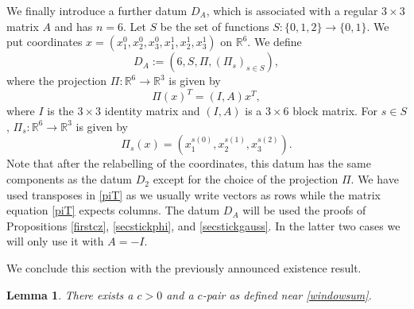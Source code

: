 \documentclass[12pt,reqno]{amsart}
\theoremstyle{plain}
\newtheorem{lemma}[theorem]{Lemma}
\theoremstyle{definition}
\numberwithin{equation}{section}
\newcommand{\R}{{\mathbb R}}
\begin{document}
 

 
We finally introduce a further datum $D_A$, which is 
  associated with a   regular $3\times 3$ matrix  $A$ and has $n=6$.   Let  $S$ be the set of functions $S:\{0,1,2\} \to \{0,1\}$.  We put coordinates  $x=(x_1^0,x_2^0,x_{3}^0,x_{1}^1,x_{2}^1,x_{3}^1)$ on $\R^6$. 
We define
\begin{equation} \label{datumDA}
    D_A:=(6,S, \Pi,(\Pi_s)_{s\in S}),
\end{equation}
 where 
the projection 
$\Pi:\R^6\to \R^3$ is given by 
\begin{equation}
    \label{piT}
    \Pi(x)^T = (I,A) x^T,
\end{equation}
 where  $I$ is the $3\times 3$ identity matrix and $(I,A)$ is a $3 \times 6$ block matrix. For $s\in S$,   $\Pi_s: \R^6 \to \R^3$ is given by
\[\Pi_{s}(x)= (x_1^{s(0)}, x_2^{s(1)}, x_3^{s(2)}). \]
Note that after the relabelling of the coordinates, this datum has the same components as the datum $D_2$ except for the choice of the projection $\Pi$. We have used transposes in \eqref{piT} as we usually write vectors as rows while  the matrix equation  \eqref{piT} expects columns.
The   datum $D_A$  will 
  be used   the proofs of Propositions \ref{firstcz}, \ref{secstickphi}, and \ref{secstickgauss}. In the latter two cases we will only use it with $A=-I$.   
 














We conclude this section with the previously announced  existence result.

\begin{lemma}\label{cnwindow} 
There exists a $c>0$ and a $c$-pair as defined near \eqref{windowsum}. 
\end{lemma}
\end{document}
